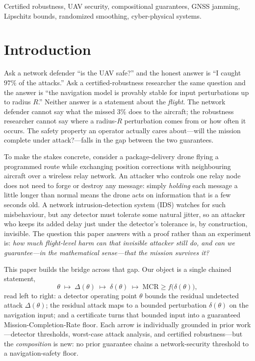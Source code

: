 \documentclass[conference]{IEEEtran}
\newcommand{\MCR}{\mathrm{MCR}}
\begin{document}
\begin{IEEEkeywords}
Certified robustness, UAV security, compositional guarantees, GNSS jamming,
Lipschitz bounds, randomized smoothing, cyber-physical systems.
\end{IEEEkeywords}

\section{Introduction}
Ask a network defender ``is the UAV safe?'' and the honest answer is ``I caught
$97\%$ of the attacks.'' Ask a certified-robustness researcher the same question
and the answer is ``the navigation model is provably stable for input
perturbations up to radius $R$.'' Neither answer is a statement about the
\emph{flight}. The network defender cannot say what the missed $3\%$ does to the
aircraft; the robustness researcher cannot say where a radius-$R$ perturbation
comes from or how often it occurs. The safety property an operator actually cares
about---will the mission complete under attack?---falls in the gap between the two
guarantees.

To make the stakes concrete, consider a package-delivery drone flying a
programmed route while exchanging position corrections with neighbouring
aircraft over a wireless relay network. An attacker who controls one relay node
does not need to forge or destroy any message: simply \emph{holding} each
message a little longer than normal means the drone acts on information that is
a few seconds old. A network intrusion-detection system (IDS) watches for such
misbehaviour, but any detector must tolerate some natural jitter, so an attacker
who keeps its added delay just under the detector's tolerance is, by
construction, invisible. The question this paper answers with a proof rather
than an experiment is: \emph{how much flight-level harm can that invisible
attacker still do, and can we guarantee---in the mathematical sense---that the
mission survives it?}

This paper builds the bridge across that gap. Our object is a single chained
statement,
\begin{equation}
\label{eq:chain}
\theta \;\longmapsto\; \Delta(\theta) \;\longmapsto\; \delta(\theta)
\;\longmapsto\; \MCR \ge f\big(\delta(\theta)\big),
\end{equation}
read left to right: a detector operating point $\theta$ bounds the residual
undetected attack $\Delta(\theta)$; the residual attack maps to a bounded
perturbation $\delta(\theta)$ on the navigation input; and a certificate turns
that bounded input into a guaranteed Mission-Completion-Rate floor. Each arrow is
individually grounded in prior work---detector thresholds, worst-case attack
analysis, and certified robustness---but the \emph{composition} is new: no prior
guarantee chains a network-security threshold to a navigation-safety floor.
\end{document}
